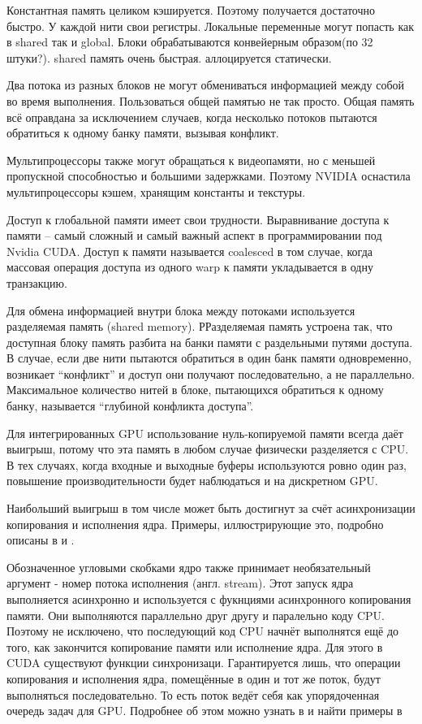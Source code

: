 \documentclass[a4paper,14pt,russian]{extreport}
\begin{document}
\par Константная память целиком кэшируется. Поэтому получается достаточно быстро. У каждой нити свои регистры. Локальные переменные могут попасть как в shared так и global. Блоки обрабатываются конвейерным образом(по 32 штуки?). shared память очень быстрая. аллоцируется статически. 
\par Два потока из разных блоков не могут обмениваться информацией между собой во время выполнения. Пользоваться общей памятью не так просто. Общая память всё оправдана за исключением случаев, когда несколько потоков пытаются обратиться к одному банку памяти, вызывая конфликт. 
\par Мультипроцессоры также могут обращаться к видеопамяти, но с меньшей пропускной способностью и большими задержками. Поэтому NVIDIA оснастила мультипроцессоры кэшем, хранящим константы и текстуры. 
\par Доступ к глобальной памяти имеет свои трудности. Выравнивание доступа к памяти – самый сложный и самый важный аспект в программировании под Nvidia CUDA. Доступ к памяти называется coalesced в том случае, когда массовая операция доступа из одного warp к памяти укладывается в одну транзакцию.
\par Для обмена информацией внутри блока между потоками используется разделяемая память (shared memory). РРазделяемая память устроена так, что доступная блоку память разбита на банки памяти с раздельными путями доступа. В случае, если две нити пытаются обратиться в один банк памяти одновременно, возникает “конфликт” и доступ они получают последовательно, а не параллельно. Максимальное количество нитей в блоке, пытающихся обратиться к одному банку, называется “глубиной конфликта доступа”.
\par Для интегрированных GPU использование нуль-копируемой памяти всегда даёт выигрыш, потому что эта память в любом случае физически разделяется с CPU. В тех случаях, когда входные и выходные буферы используются ровно один раз, повышение производительности будет наблюдаться и на дискретном GPU.
\par Наибольший выигрыш в том числе может быть достигнут за счёт асинхронизации копирования и исполнения ядра. Примеры, иллюстрирующие это, подробно описаны в \cite{sanders} и \cite{cuda_best}. 
\par Обозначенное угловыми скобками ядро также принимает необязательный аргумент - номер потока исполнения (англ. stream). Этот запуск ядра выполняется асинхронно и используется с фукнциями асинхронного копирования памяти. Они выполняются параллельно друг другу и паралельно коду CPU. Поэтому не исключено, что последующий код CPU начнёт выполнятся ещё до того, как закончится копирование памяти или исполнение ядра. Для этого в CUDA существуют функции синхронизаци. Гарантируется лишь, что операции копирования и исполнения ядра, помещённые в один и тот же поток, будут выполняться последовательно. То есть поток ведёт себя как упорядоченная очередь задач для GPU. Подробнее об этом можно узнать в \cite{cuda_guide} и найти примеры в \cite{sanders}
\end{document}
